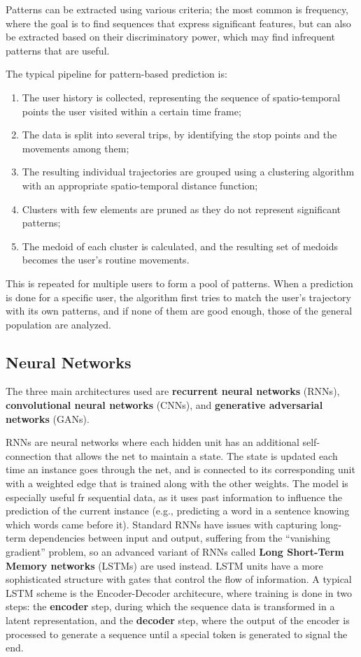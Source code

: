 Patterns can be extracted using various criteria; the most common is frequency, where the goal is to find sequences that express significant features, but can also be extracted based on their discriminatory power, which may find infrequent patterns that are useful.

The typical pipeline for pattern-based prediction is:
\begin{enumerate}[noitemsep]
    \item The user history is collected, representing the sequence of spatio-temporal points the user visited within a certain time frame;
    \item The data is split into several trips, by identifying the stop points and the movements among them;
    \item The resulting individual trajectories are grouped using a clustering algorithm with an appropriate spatio-temporal distance function;
    \item Clusters with few elements are pruned as they do not represent significant patterns;
    \item The medoid of each cluster is calculated, and the resulting set of medoids becomes the user's routine movements.
\end{enumerate}
This is repeated for multiple users to form a pool of patterns. When a prediction is done for a specific user, the algorithm first tries to match the user's trajectory with its own patterns, and if none of them are good enough, those of the general population are analyzed.

\subsection{Neural Networks}

The three main architectures used are \textbf{recurrent neural networks} (RNNs), \textbf{convolutional neural networks} (CNNs), and \textbf{generative adversarial networks} (GANs).

RNNs are neural networks where each hidden unit has an additional self-connection that allows the net to maintain a state. The state is updated each time an instance goes through the net, and is connected to its corresponding unit with a weighted edge that is trained along with the other weights. The model is especially useful fr sequential data, as it uses past information to influence the prediction of the current instance (e.g., predicting a word in a sentence knowing which words came before it). Standard RNNs have issues with capturing long-term dependencies between input and output, suffering from the ``vanishing gradient'' problem, so an advanced variant of RNNs called \textbf{Long Short-Term Memory networks} (LSTMs) are used instead. LSTM units have a more sophisticated structure with gates that control the flow of information. A typical LSTM scheme is the Encoder-Decoder architecure, where training is done in two steps: the \textbf{encoder} step, during which the sequence data is transformed in a latent representation, and the \textbf{decoder} step, where the output of the encoder is processed to generate a sequence until a special token is generated to signal the end.

